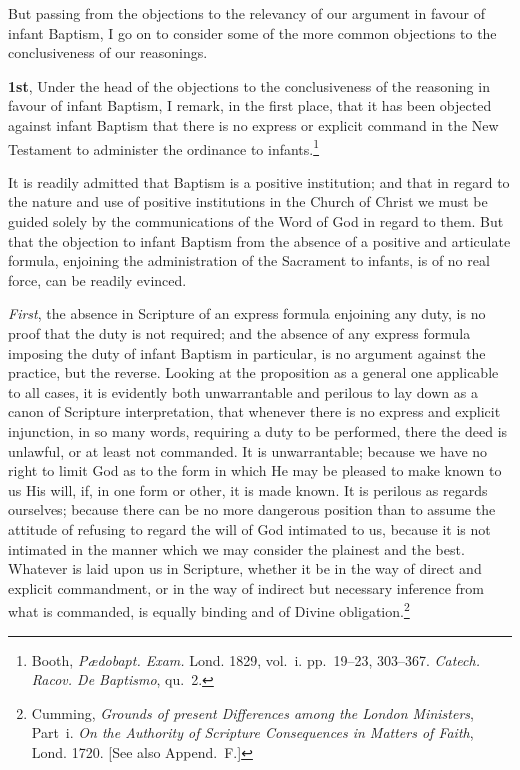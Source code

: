 \documentclass[
  english,
]{book}
\begin{document}
But passing from the objections to the relevancy of our argument in favour of infant Baptism, I go on to consider some of the more common objections to the conclusiveness of our reasonings.

\textbf{1st}, Under the head of the objections to the conclusiveness of the reasoning in favour of infant Baptism, I remark, in the first place, that it has been objected against infant Baptism that there is no express or explicit command in the New Testament to administer the ordinance to infants.\footnote{Booth, \emph{Pædobapt. Exam.} Lond. 1829, vol.~i. pp.~19--23, 303--367. \emph{Catech. Racov. De Baptismo}, qu.~2.}

It is readily admitted that Baptism is a positive institution; and that in regard to the nature and use of positive institutions in the Church of Christ we must be guided solely by the communications of the Word of God in regard to them. But that the objection to infant Baptism from the absence of a positive and articulate formula, enjoining the administration of the Sacrament to infants, is of no real force, can be readily evinced.

\emph{First}, the absence in Scripture of an express formula enjoining any duty, is no proof that the duty is not required; and the absence of any express formula imposing the duty of infant Baptism in particular, is no argument against the practice, but the reverse. Looking at the proposition as a general one applicable to all cases, it is evidently both unwarrantable and perilous to lay down as a canon of Scripture interpretation, that whenever there is no express and explicit injunction, in so many words, requiring a duty to be performed, there the deed is unlawful, or at least not commanded. It is unwarrantable; because we have no right to limit God as to the form in which He may be pleased to make known to us His will, if, in one form or other, it is made known. It is perilous as regards ourselves; because there can be no more dangerous position than to assume the attitude of refusing to regard the will of God intimated to us, because it is not intimated in the manner which we may consider the plainest and the best. Whatever is laid upon us in Scripture, whether it be in the way of direct and explicit commandment, or in the way of indirect but necessary inference from what is commanded, is equally binding and of Divine obligation.\footnote{Cumming, \emph{Grounds of present Differences among the London Ministers}, Part~i. \emph{On the Authority of Scripture Consequences in Matters of Faith}, Lond. 1720. {[}See also Append.~F.{]}}
\end{document}
